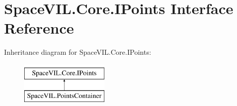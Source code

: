 \hypertarget{interface_space_v_i_l_1_1_core_1_1_i_points}{}\section{Space\+V\+I\+L.\+Core.\+I\+Points Interface Reference}
\label{interface_space_v_i_l_1_1_core_1_1_i_points}
Inheritance diagram for Space\+V\+I\+L.\+Core.\+I\+Points\+:\begin{figure}[H]
\begin{center}
\leavevmode
\includegraphics[height=2.000000cm]{interface_space_v_i_l_1_1_core_1_1_i_points}
\end{center}
\end{figure}

